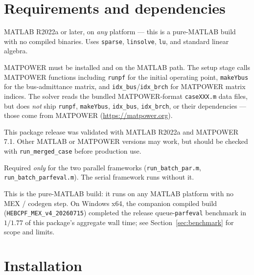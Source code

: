 \documentclass[11pt,a4paper]{article}
\newcommand{\code}[1]{\texttt{#1}}
\begin{document}
\section{Requirements and dependencies}

\begin{description}[leftmargin=0em,style=nextline]
\item[MATLAB (required).] MATLAB R2022a or later, on \emph{any} platform --- this is a
      pure-MATLAB build with no compiled binaries. Uses \code{sparse}, \code{linsolve},
      \code{lu}, and standard linear algebra.
\item[MATPOWER (required).] MATPOWER must be installed and on the MATLAB path. The setup
      stage calls MATPOWER functions including \code{runpf} for the initial operating
      point, \code{makeYbus} for the bus-admittance matrix, and
      \code{idx_bus}/\code{idx_brch} for MATPOWER matrix indices. The solver reads the
      bundled MATPOWER-format \code{caseXXX.m} data files, but does \emph{not} ship
      \code{runpf}, \code{makeYbus}, \code{idx_bus}, \code{idx_brch}, or their
      dependencies --- those come from MATPOWER (\url{https://matpower.org}).
\item[Validated setup.] This package release was validated with MATLAB R2022a and
      MATPOWER 7.1. Other MATLAB or MATPOWER versions may work, but should be checked with
      \code{run_merged_case} before production use.
\item[Parallel Computing Toolbox (optional).] Required \emph{only} for the two parallel
      frameworks (\code{run_batch_par.m}, \code{run_batch_parfeval.m}). The serial
      framework runs without it.
\item[No compiler needed.] This is the pure-MATLAB build: it runs on any MATLAB platform
      with no MEX / codegen step. On Windows x64, the companion compiled build
      (\code{HEBCPF_MEX_v4_20260715}) completed the release queue-\code{parfeval}
      benchmark in $1/1.77$ of this package's aggregate wall time; see
      Section~\ref{sec:benchmark} for scope and limits.
\end{description}

\section{Installation}
\end{document}
